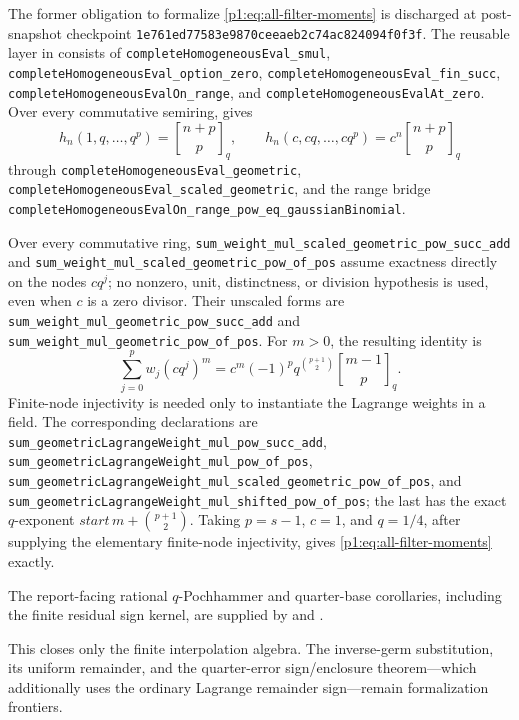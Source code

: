 \documentclass[11pt,oneside]{article}
\numberwithin{equation}{section}
\theoremstyle{definition}
\theoremstyle{remark}
\newcommand{\qbinom}[3]{\genfrac{[}{]}{0pt}{}{#1}{#2}_{#3}}
\begin{document}
\begin{remark}
The former obligation to formalize \eqref{p1:eq:all-filter-moments} is discharged
at post-snapshot checkpoint
\nolinkurl{1e761ed77583e9870ceeaeb2c74ac824094f0f3f}.  The reusable layer in
 consists of
\nolinkurl{completeHomogeneousEval_smul},
\nolinkurl{completeHomogeneousEval_option_zero},
\nolinkurl{completeHomogeneousEval_fin_succ},
\nolinkurl{completeHomogeneousEvalOn_range}, and
\nolinkurl{completeHomogeneousEvalAt_zero}.  Over every commutative semiring,
 gives
\[
 h_n(1,q,\ldots,q^p)=\qbinom{n+p}{p}{q},
 \qquad
 h_n(c,cq,\ldots,cq^p)=c^n\qbinom{n+p}{p}{q}
\]
through \nolinkurl{completeHomogeneousEval_geometric},
\nolinkurl{completeHomogeneousEval_scaled_geometric}, and the range bridge
\nolinkurl{completeHomogeneousEvalOn_range_pow_eq_gaussianBinomial}.

Over every commutative ring,
\nolinkurl{sum_weight_mul_scaled_geometric_pow_succ_add} and
\nolinkurl{sum_weight_mul_scaled_geometric_pow_of_pos} assume exactness
directly on the nodes \(c q^j\); no nonzero, unit, distinctness, or division
hypothesis is used, even when \(c\) is a zero divisor.  Their unscaled forms
are \nolinkurl{sum_weight_mul_geometric_pow_succ_add} and
\nolinkurl{sum_weight_mul_geometric_pow_of_pos}.  For \(m>0\), the resulting
identity is
\[
 \sum_{j=0}^{p}w_j(cq^j)^m
 =c^m(-1)^p q^{\binom{p+1}{2}}\qbinom{m-1}{p}{q}.
\]
Finite-node injectivity is needed only to instantiate the Lagrange weights in
a field.  The corresponding declarations are
\nolinkurl{sum_geometricLagrangeWeight_mul_pow_succ_add},
\nolinkurl{sum_geometricLagrangeWeight_mul_pow_of_pos},
\nolinkurl{sum_geometricLagrangeWeight_mul_scaled_geometric_pow_of_pos}, and
\nolinkurl{sum_geometricLagrangeWeight_mul_shifted_pow_of_pos}; the last has
the exact \(q\)-exponent
\(start\,m+\binom{p+1}{2}\).  Taking \(p=s-1\), \(c=1\), and \(q=1/4\), after
supplying the elementary finite-node injectivity, gives
\eqref{p1:eq:all-filter-moments} exactly.

The report-facing rational \(q\)-Pochhammer and quarter-base corollaries,
including the finite residual sign kernel, are supplied by
 and
.

This closes only the finite interpolation algebra.  The inverse-germ
substitution, its uniform remainder, and the quarter-error sign/enclosure
theorem---which additionally uses the ordinary Lagrange remainder
sign---remain formalization frontiers.
\end{remark}
\end{document}
